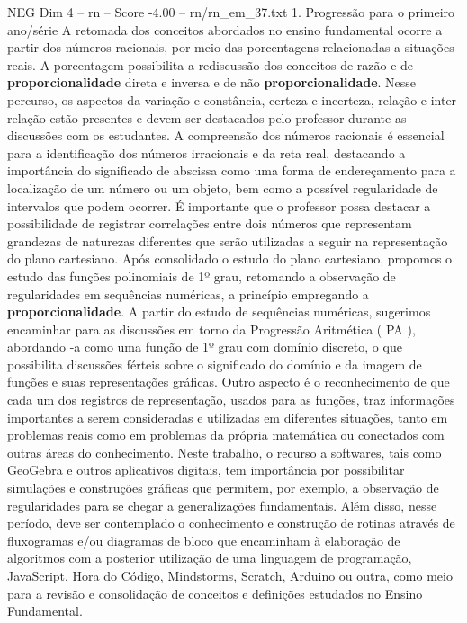 \begin{textsample}{NEG Dim 4 – rn – Score -4.00 – rn/rn\_em\_37.txt}  \label{ex:f4_neg_201}
1.
Progressão para o primeiro ano/série A retomada dos conceitos abordados no ensino fundamental ocorre a partir dos números racionais, por meio das porcentagens relacionadas a situações reais.
A porcentagem possibilita a rediscussão dos conceitos de razão e de \textbf{proporcionalidade} direta e inversa e de não \textbf{proporcionalidade}.
Nesse percurso, os aspectos da variação e constância, certeza e incerteza, relação e inter-relação estão presentes e devem ser destacados pelo professor durante as discussões com os estudantes.
A compreensão dos números racionais é essencial para a identificação dos números irracionais e da reta real, destacando a importância do significado de abscissa como uma forma de endereçamento para a localização de um número ou um objeto, bem como a possível regularidade de intervalos que podem ocorrer.
É importante que o professor possa destacar a possibilidade de registrar correlações entre dois números que representam grandezas de naturezas diferentes que serão utilizadas a seguir na representação do plano cartesiano.
Após consolidado o estudo do plano cartesiano, propomos o estudo das funções polinomiais de 1º grau, retomando a observação de regularidades em sequências numéricas, a princípio empregando a \textbf{proporcionalidade}.
A partir do estudo de sequências numéricas, sugerimos encaminhar para as discussões em torno da Progressão Aritmética ( PA ), abordando -a como uma função de 1º grau com domínio discreto, o que possibilita discussões férteis sobre o significado do domínio e da imagem de funções e suas representações gráficas.
Outro aspecto é o reconhecimento de que cada um dos registros de representação, usados para as funções, traz informações importantes a serem consideradas e utilizadas em diferentes situações, tanto em problemas reais como em problemas da própria matemática ou conectados com outras áreas do conhecimento.
Neste trabalho, o recurso a softwares, tais como GeoGebra e outros aplicativos digitais, tem importância por possibilitar simulações e construções gráficas que permitem, por exemplo, a observação de regularidades para se chegar a generalizações fundamentais.
Além disso, nesse período, deve ser contemplado o conhecimento e construção de rotinas através de fluxogramas e/ou diagramas de bloco que encaminham à elaboração de algoritmos com a posterior utilização de uma linguagem de programação, JavaScript, Hora do Código, Mindstorms, Scratch, Arduino ou outra, como meio para a revisão e consolidação de conceitos e definições estudados no Ensino Fundamental.

\end{textsample}
